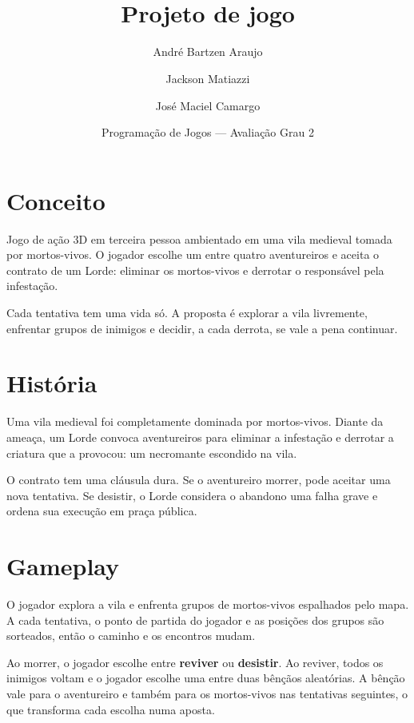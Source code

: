 \documentclass[11pt,a4paper]{article}
\title{\textbf{\jogo} \\ \large Projeto de jogo}
\author{André Bartzen Araujo \and Jackson Matiazzi \and José Maciel Camargo}
\date{Programação de Jogos --- Avaliação Grau 2}
\begin{document}
\maketitle
\thispagestyle{empty}

\section{Conceito}

Jogo de ação 3D em terceira pessoa ambientado em uma vila medieval tomada por mortos-vivos. O jogador escolhe um entre quatro aventureiros e aceita o contrato de um Lorde: eliminar os mortos-vivos e derrotar o responsável pela infestação.

Cada tentativa tem uma vida só. A proposta é explorar a vila livremente, enfrentar grupos de inimigos e decidir, a cada derrota, se vale a pena continuar.

\section{História}

Uma vila medieval foi completamente dominada por mortos-vivos. Diante da ameaça, um Lorde convoca aventureiros para eliminar a infestação e derrotar a criatura que a provocou: um necromante escondido na vila.

O contrato tem uma cláusula dura. Se o aventureiro morrer, pode aceitar uma nova tentativa. Se desistir, o Lorde considera o abandono uma falha grave e ordena sua execução em praça pública.

\section{Gameplay}

O jogador explora a vila e enfrenta grupos de mortos-vivos espalhados pelo mapa. A cada tentativa, o ponto de partida do jogador e as posições dos grupos são sorteados, então o caminho e os encontros mudam.

Ao morrer, o jogador escolhe entre \textbf{reviver} ou \textbf{desistir}. Ao reviver, todos os inimigos voltam e o jogador escolhe uma entre duas bênçãos aleatórias. A bênção vale para o aventureiro e também para os mortos-vivos nas tentativas seguintes, o que transforma cada escolha numa aposta.
\end{document}

